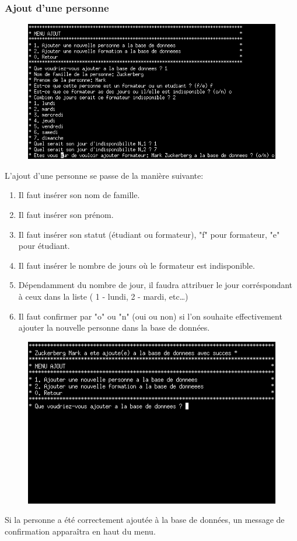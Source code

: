 \documentclass[11pt]{article}
\begin{document}
\subsubsection{Ajout d'une personne}
\begin{figure}[ht]
  \centering
  \includegraphics[width=\textwidth]{images/07.png}
\end{figure}
L'ajout d'une personne se passe de la manière suivante:
\begin{enumerate}
\item Il faut insérer son nom de famille.
\item Il faut insérer son prénom.
\item Il faut insérer son statut (étudiant ou formateur), "f" pour formateur, "e" pour étudiant.
\item Il faut insérer le nombre de jours où le formateur est indisponible.
\item Dépendamment du nombre de jour, il faudra attribuer le jour corréspondant à ceux dans la liste ( 1 - lundi, 2 - mardi, etc\ldots)
\item Il faut confirmer par "o" ou "n" (oui ou non) si l'on souhaite effectivement ajouter la nouvelle personne dans la base de données.
\end{enumerate}

\newpage
\begin{figure}[ht]
  \centering
  \includegraphics[trim=0 180 0 10, clip, width=\textwidth]{images/08.png}
\end{figure}
Si la personne a été correctement ajoutée à la base de données, un message de confirmation apparaîtra en haut du menu.
\end{document}
